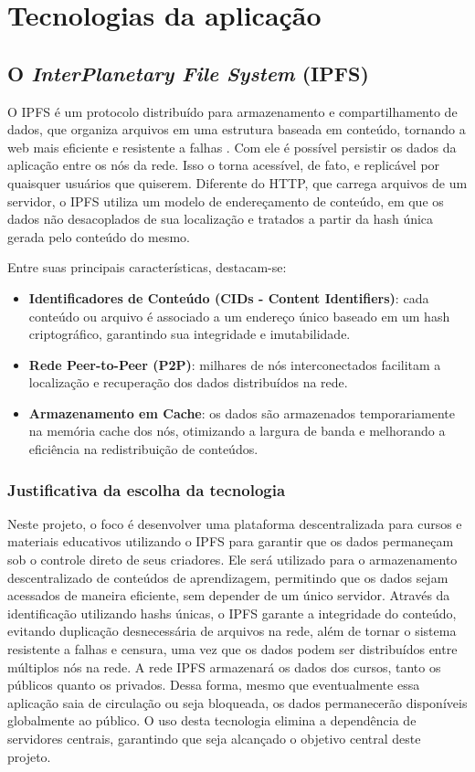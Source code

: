 \section{Tecnologias da aplicação}

\subsection{O \textit{InterPlanetary File System} (IPFS)}
\label{sec:ipfs}
O IPFS é um protocolo distribuído para armazenamento e compartilhamento de dados, que organiza arquivos em uma estrutura baseada em conteúdo, tornando a web mais eficiente e resistente a falhas \cite{ipfs2025}. Com ele é possível persistir os dados da aplicação entre os nós da rede. Isso o torna acessível, de fato, e replicável por quaisquer usuários que quiserem. Diferente do HTTP, que carrega arquivos de um servidor, o IPFS utiliza um modelo de endereçamento de conteúdo, em que os dados não desacoplados de sua localização e tratados a partir da hash única gerada pelo conteúdo do mesmo.

Entre suas principais características, destacam-se:

\begin{itemize}
    \item \textbf{Identificadores de Conteúdo (CIDs - Content Identifiers)}: cada conteúdo ou arquivo é associado a um endereço único baseado em um hash criptográfico, garantindo sua integridade e imutabilidade.
    
    \item \textbf{Rede Peer-to-Peer (P2P)}: milhares de nós interconectados facilitam a localização e recuperação dos dados distribuídos na rede.
    
    \item \textbf{Armazenamento em Cache}: os dados são armazenados temporariamente na memória cache dos nós, otimizando a largura de banda e melhorando a eficiência na redistribuição de conteúdos.
\end{itemize}

\subsubsection{Justificativa da escolha da tecnologia}
Neste projeto, o foco é desenvolver uma plataforma descentralizada para cursos e materiais educativos utilizando o IPFS para garantir que os dados permaneçam sob o controle direto de seus criadores. Ele será utilizado para o armazenamento descentralizado de conteúdos de aprendizagem, permitindo que os dados sejam acessados de maneira eficiente, sem depender de um único servidor. Através da identificação utilizando hashs únicas, o IPFS garante a integridade do conteúdo, evitando duplicação desnecessária de arquivos na rede, além de tornar o sistema resistente a falhas e censura, uma vez que os dados podem ser distribuídos entre múltiplos nós na rede. A rede IPFS armazenará os dados dos cursos, tanto os públicos quanto os privados. Dessa forma, mesmo que eventualmente essa aplicação saia de circulação ou seja bloqueada, os dados permanecerão disponíveis globalmente ao público. O uso desta tecnologia elimina a dependência de servidores centrais, garantindo que seja alcançado o objetivo central deste projeto.

